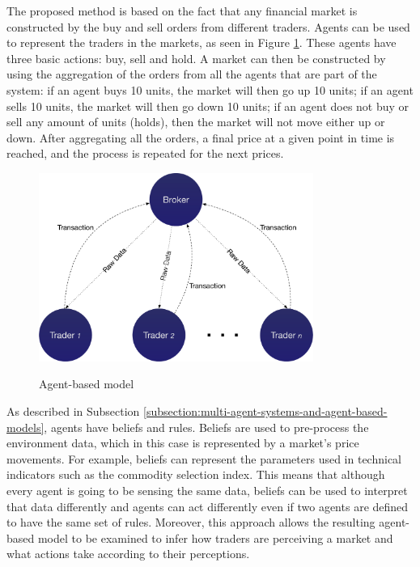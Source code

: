 \documentclass[review]{elsarticle}
\begin{document}
The proposed method is based on the fact that any financial market is
constructed by the buy and sell orders from different traders. Agents can be
used to represent the traders in the markets, as seen in Figure
\ref{figure:agent-based-model}. These agents have three basic actions: buy, sell
and hold. A market can then be constructed by using the aggregation of the
orders from all the agents that are part of the system: if an agent buys 10
units, the market will then go up 10 units; if an agent sells 10 units, the
market will then go down 10 units; if an agent does not buy or sell any amount
of units (holds), then the market will not move either up or down. After
aggregating all the orders, a final price at a given point in time is reached,
and the process is repeated for the next prices.

\begin{figure}
\caption{Agent-based model}
\centering
\includegraphics[width=0.8\textwidth]{img/agent-model.pdf}
\label{figure:agent-based-model}
\end{figure}

As described in Subsection
\ref{subsection:multi-agent-systems-and-agent-based-models}, agents have beliefs
and rules. Beliefs are used to pre-process the environment data, which in this
case is represented by a market's price movements. For example, beliefs can
represent the parameters used in technical indicators such as the commodity
selection index. This means that although every agent is going to be sensing the
same data, beliefs can be used to interpret that data differently and agents can
act differently even if two agents are defined to have the same set of
rules. Moreover, this approach allows the resulting agent-based model to be
examined to infer how traders are perceiving a market and what actions take
according to their perceptions.
\end{document}
